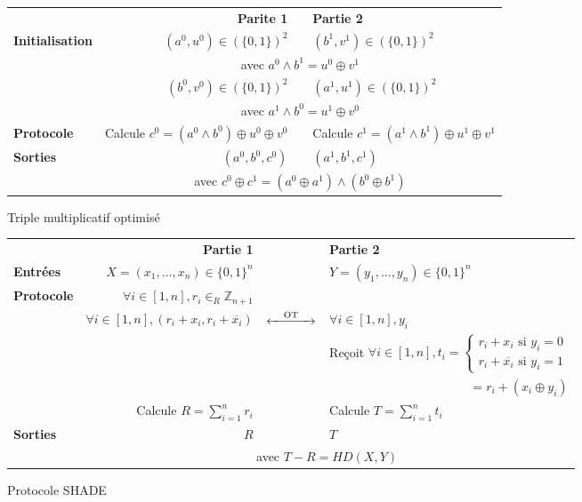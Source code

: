 \documentclass{article}
\begin{document}
\begin{figure}[h]
\centering
\begin{tabular}{|lrcl|}
\hline
 & \textbf{Parite 1} & & \textbf{Partie 2}\\
\textbf{Initialisation} & $(a^0, u^0) \in (\{0, 1\})^2$ & & $(b^1, v^1) \in (\{0, 1\})^2$\\
 & \multicolumn{3}{c|}{avec $a^0 \land b^1 = u^0 \oplus v^1$} \\
  & $(b^0, v^0) \in (\{0, 1\})^2$ & & $(a^1, u^1) \in (\{0, 1\})^2$\\
 & \multicolumn{3}{c|}{avec $a^1 \land b^0 = u^1 \oplus v^0$} \\
\textbf{Protocole} & Calcule $c^0 = (a^0 \land b^0) \oplus u^0 \oplus v^0$ & & Calcule $c^1 = (a^1 \land b^1) \oplus u^1 \oplus v^1$ \\
\textbf{Sorties} & $(a^0, b^0, c^0)$ & & $(a^1, b^1, c^1)$ \\
  & \multicolumn{3}{c|}{avec $c^0 \oplus c^1 = (a^0 \oplus a^1) \land (b^0 \oplus b^1)$} \\
\hline
\end{tabular}
\captionsetup{labelformat=empty}
\caption{Triple multiplicatif optimisé}
\end{figure}

\begin{figure}[h]
\centering
\begin{tabular}{|lrcl|}
\hline
 & \textbf{Partie 1} & & \textbf{Partie 2}\\
\textbf{Entrées} & $X =(x_1, ..., x_n) \in \{0, 1\}^n$ & & $Y =(y_1, ..., y_n) \in \{0, 1\}^n$\\
\textbf{Protocole} & $\forall i \in [1, n], r_i \in_R \mathbb{Z}_{n+1}$ & & \\
 & $\forall i \in [1, n], (r_i+x_i, r_i + \overline{x_i})$ & $\xleftrightarrow{\hspace{1em} \text{OT}\hspace{1em} }$ & $\forall i \in [1,n], y_i$ \\
 & & & Reçoit $\forall i \in [1,n], t_i = \begin{cases} r_i+x_i \text{ si } y_i = 0 \\ r_i + \overline{x_i} \text{ si } y_i = 1 \end{cases}$\\
\multicolumn{4}{|r|}{$= r_i + (x_i \oplus y_i)$} \\
 & Calcule $R = \sum_{i=1}^n r_i$ & & Calcule $T = \sum_{i=1}^n t_i$ \\
\textbf{Sorties} & $R$ & & $T$ \\
 & \multicolumn{3}{c|}{avec $T - R = HD(X, Y)$} \\
\hline
\end{tabular}
\captionsetup{labelformat=empty}
\caption{Protocole SHADE}
\end{figure}
\end{document}
